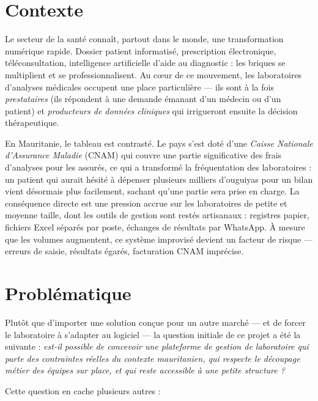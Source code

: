 \documentclass[12pt, a4paper, oneside]{report}
\begin{document}
\section*{Contexte}
Le secteur de la santé connaît, partout dans le monde, une transformation
numérique rapide. Dossier patient informatisé, prescription électronique,
téléconsultation, intelligence artificielle d'aide au diagnostic : les
briques se multiplient et se professionnalisent. Au cœur de ce mouvement,
les laboratoires d'analyses médicales occupent une place particulière —
ils sont à la fois \emph{prestataires} (ils répondent à une demande
émanant d'un médecin ou d'un patient) et \emph{producteurs de données
cliniques} qui irrigueront ensuite la décision thérapeutique.

En Mauritanie, le tableau est contrasté. Le pays s'est doté d'une
\textit{Caisse Nationale d'Assurance Maladie} (CNAM) qui couvre une
partie significative des frais d'analyses pour les assurés, ce qui a
transformé la fréquentation des laboratoires : un patient qui aurait
hésité à dépenser plusieurs milliers d'ouguiyas pour un bilan vient
désormais plus facilement, sachant qu'une partie sera prise en charge.
La conséquence directe est une pression accrue sur les laboratoires de
petite et moyenne taille, dont les outils de gestion sont restés
artisanaux : registres papier, fichiers Excel séparés par poste, échanges
de résultats par WhatsApp. À mesure que les volumes augmentent, ce
système improvisé devient un facteur de risque — erreurs de saisie,
résultats égarés, facturation CNAM imprécise.

\section*{Problématique}
Plutôt que d'importer une solution conçue pour un autre marché — et de
forcer le laboratoire à s'adapter au logiciel — la question initiale de
ce projet a été la suivante : \emph{est-il possible de concevoir une
plateforme de gestion de laboratoire qui parte des contraintes réelles
du contexte mauritanien, qui respecte le découpage métier des équipes
sur place, et qui reste accessible à une petite structure ?}

Cette question en cache plusieurs autres :
\end{document}
